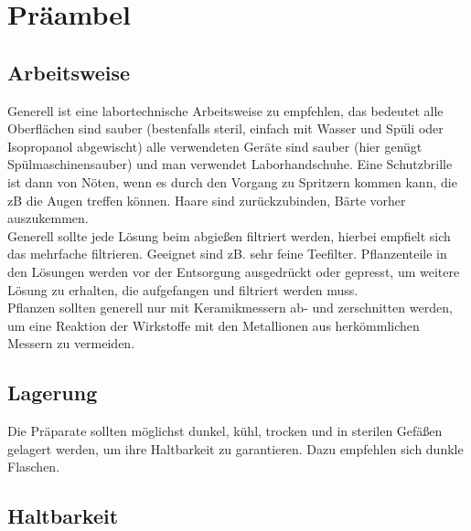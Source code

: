 
\chapter{Präambel}
\label{   }


\section{Arbeitsweise}
\label{   }

Generell ist eine labortechnische Arbeitsweise zu empfehlen, das bedeutet alle Oberflächen sind sauber (bestenfalls steril, einfach mit Wasser und Spüli oder Isopropanol abgewischt) alle verwendeten Geräte sind sauber (hier genügt Spülmaschinensauber) und man verwendet Laborhandschuhe. Eine Schutzbrille ist dann von Nöten, wenn es durch den Vorgang zu Spritzern kommen kann, die zB die Augen treffen können. Haare sind zurückzubinden, Bärte vorher auszukemmen.\\
Generell sollte jede Lösung beim abgießen filtriert werden, hierbei empfielt sich das mehrfache filtrieren. Geeignet sind zB. sehr feine Teefilter. Pflanzenteile in den Lösungen werden vor der Entsorgung ausgedrückt oder gepresst, um weitere Lösung zu erhalten, die aufgefangen und filtriert werden muss.\\
Pflanzen sollten generell nur mit Keramikmessern ab- und zerschnitten werden, um eine Reaktion der Wirkstoffe mit den Metallionen aus herkömmlichen Messern zu vermeiden.\\



\section{Lagerung}
\label{   }

Die Präparate sollten möglichst dunkel, kühl, trocken und in sterilen Gefäßen gelagert werden, um ihre Haltbarkeit zu garantieren. Dazu empfehlen sich dunkle Flaschen.



\section{Haltbarkeit}
\label{   }

